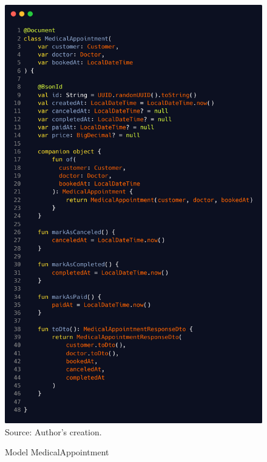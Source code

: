 \begin{figure}[HContext]
	\centering
	\caption{Model MedicalAppointment}
	\includegraphics[width=0.85\linewidthContext]{figures/medical_appointment}
	\label{fig:medicalappointment}
	\\ \footnotesize Source: Author's creation.
\end{figure}

